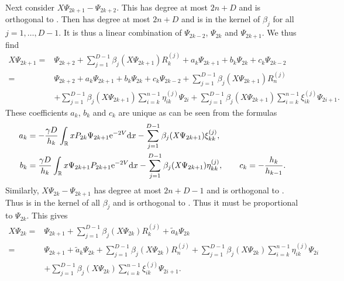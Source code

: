 \documentclass[pdftex]{sigma}
\numberwithin{equation}{section}
\begin{document}
Next consider $\mathit{X} \Psi_{2k+1} - \Psi_{2k+2}$. This has degree at most $2n+D$ and is orthogonal to . Then  has degree at most $2n+D$ and is in the kernel of $\beta_j$ for all $j=1, \dots, D-1$. It is thus a linear combination of $\Psi_{2k-2}$, $\Psi_{2k}$ and $\Psi_{2k+1}$. We thus find
\begin{align*}
\mathit{X} \Psi_{2k+1} ={}& \Psi_{2k+2} + \sum_{j=1}^{D-1} \beta_j ( \mathit{X} \Psi_{2k+1}) R_k^{(j)} + a_k \Psi_{2k+1} + b_k \Psi_{2k} + c_k \Psi_{2k-2} \\
={}& \Psi_{2k+2} + a_k \Psi_{2k+1} + b_k \Psi_{2k} + c_k \Psi_{2k-2} + \sum_{j=1}^{D-1} \beta_j ( \mathit{X} \Psi_{2k+1}) R_n^{(j)}\\
& + \sum_{j=1}^{D-1} \beta_j ( \mathit{X} \Psi_{2k+1}) \sum_{i=k}^{n-1} \eta_{ik}^{(j)} \Psi_{2i} + \sum_{j=1}^{D-1} \beta_j ( \mathit{X} \Psi_{2k+1}) \sum_{i=k}^{n-1} \xi_{ik}^{(j)} \Psi_{2i+1} .
\end{align*}
These coefficients $a_k$, $b_k$ and $c_k$ are unique as can be seen from the formulas
\begin{align*}
a_k &=
 - \frac{\gamma D}{h_k} \int_\mathbb{R} x P_{2k} \Psi_{2k+1} {\rm e}^{-2V} {\rm d}x -\sum_{j=1}^{D-1} \beta_j ( \mathit{X} \Psi_{2k+1}) \xi^{(j)}_{kk} , \\
b_k &= \frac{\gamma D}{h_k} \int_\mathbb{R} x \Psi_{2k+1} P_{2k+1} {\rm e}^{-2V} {\rm d}x - \sum_{j=1}^{D-1}\beta_j( \mathit{X} \Psi_{2k+1}) \eta^{(j)}_{kk} , \qquad
c_k = - \frac{h_k}{h_{k-1}} .
\end{align*}
Similarly, $\mathit{X} \Psi_{2k}- \Psi_{2k+1}$ has degree at most $2n+D-1$ and is orthogonal to . Thus  is in the kernel of all $\beta_j$ and is orthogonal to . Thus it must be proportional to $\Psi_{2k}$. This gives
\begin{align}
\mathit{X}\Psi_{2k} ={}& \Psi_{2k+1}+ \sum_{j=1}^{D-1} \beta_j(\mathit{X}\Psi_{2k} ) R_k^{(j)} + \tilde{a}_k \Psi_{2k} \nonumber\\
={}& \Psi_{2k+1} + \tilde{a}_k \Psi_{2k} + \sum_{j=1}^{D-1} \beta_j(\mathit{X}\Psi_{2k} ) R_n^{(j)} + \sum_{j=1}^{D-1} \beta_j(\mathit{X}\Psi_{2k} ) \sum_{i=k}^{n-1} \eta_{ik}^{(j)} \Psi_{2i}\nonumber \\
& + \sum_{j=1}^{D-1} \beta_j(\mathit{X}\Psi_{2k} ) \sum_{i=k}^{n-1} \xi_{ik}^{(j)} \Psi_{2i+1}.\label{formula}
\end{align}
\end{document}
